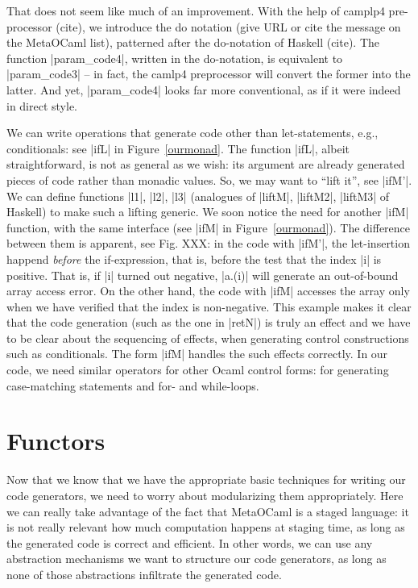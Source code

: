\documentclass{llncs}
\begin{document}
That does not seem like much of an improvement. With the help of
camplp4 pre-processor (cite), we introduce the do notation (give URL
or cite the message on the MetaOCaml list), patterned after the
do-notation of Haskell (cite). The function |param_code4|, written in
the do-notation, is equivalent to |param_code3| -- in fact, the camlp4
preprocessor will convert the former into the latter. And yet,
|param_code4| looks far more conventional, as if it were indeed in
direct style.

We can write operations that generate code other than let-statements,
e.g., conditionals: see |ifL| in Figure~\ref{ourmonad}. The function |ifL|, 
albeit straightforward, is not as general as we wish: its argument are
already generated pieces of code rather than monadic values. So, we
may want to ``lift it'', see |ifM'|. We can define functions |l1|,
|l2|, |l3| (analogues of |liftM|, |liftM2|, |liftM3| of Haskell) 
to make such a lifting generic.
We soon notice the need for another |ifM| function, with the same
interface (see |ifM| in Figure~\ref{ourmonad}). The difference between them is
apparent, see Fig. XXX: in the code with |ifM'|, the let-insertion
happend \emph{before} the if-expression, that is, before the test that
the index |i| is positive. That is, if |i| turned out
negative, |a.(i)| will generate an out-of-bound array access
error. On the other hand, the code with |ifM| accesses the array only
when we have verified that the index is non-negative. This example
makes it clear that the code generation (such as the one in |retN|) is 
truly an effect and we have to be clear about the sequencing of
effects, when generating control constructions such as conditionals.
The form |ifM| handles the such effects correctly. In our code, we
need similar operators for other Ocaml control forms: for generating
case-matching statements and for- and while-loops.

\section{Functors}\label{functors}

Now that we know that we have the appropriate basic techniques for
writing our code generators, we need to worry about modularizing them
appropriately.  Here we can really take advantage of the fact that
MetaOCaml is a staged language: it is not really relevant how much
computation happens at staging time, as long as the generated code
is correct and efficient.  In other words, we can use any abstraction
mechanisms we want to structure our code generators, as long as none
of those abstractions infiltrate the generated code.
\end{document}
